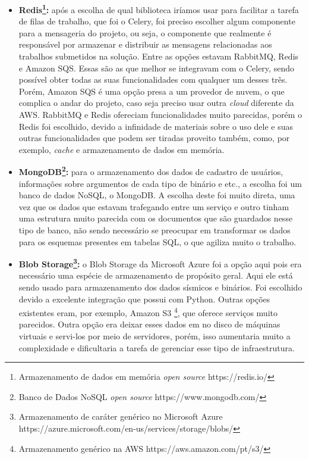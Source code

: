 \documentclass[11pt,twoside]{article}
\begin{document}
\begin{itemize}
  \item \textbf{Redis\footnote{Armazenamento de dados em memória \emph{open source} https://redis.io/}:} após a escolha de qual biblioteca iríamos usar para facilitar a tarefa de filas de trabalho, que foi o Celery, foi preciso escolher algum componente para a mensageria do projeto, ou seja, o
  componente que realmente é responsável por armazenar e distribuir as mensagens relacionadas aos trabalhos submetidos na solução. Entre as opções estavam RabbitMQ, Redis e Amazon SQS. Essas são as que melhor se 
  integravam com o Celery, sendo possível obter todas as suas funcionalidades com qualquer um desses três. Porém, Amazon SQS é uma opção presa a um provedor de nuvem, o que complica o andar do projeto, caso seja 
  preciso usar outra \emph{cloud} diferente da AWS. RabbitMQ e Redis ofereciam funcionalidades muito parecidas, porém o Redis foi escolhido, devido a infinidade de materiais sobre o uso dele e suas outras funcionalidades
  que podem ser tiradas proveito também, como, por exemplo, \emph{cache} e armazenamento de dados em memória.

  \item \textbf{MongoDB\footnote{Banco de Dados NoSQL \emph{open source} https://www.mongodb.com/}:} para o armazenamento dos dados de cadastro de usuários, informações sobre argumentos de cada tipo de binário e etc., a escolha foi um banco de dados NoSQL, o MongoDB. A escolha deste
  foi muito direta, uma vez que os dados que estavam trafegando entre um serviço e outro tinham uma estrutura muito parecida com os documentos que são guardados nesse tipo de banco, não sendo necessário se preocupar
  em transformar os dados para os esquemas presentes em tabelas SQL, o que agiliza muito o trabalho.

  \item \textbf{Blob Storage\footnote{Armazenamento de caráter genérico no Microsoft Azure https://azure.microsoft.com/en-us/services/storage/blobs/}:} o Blob Storage da Microsoft Azure foi a opção aqui pois era necessário uma espécie de armazenamento de propósito geral. Aqui ele está sendo usado para armazenamento dos dados sísmicos e
  binários. Foi escolhido devido a excelente integração que possui com Python. Outras opções existentes eram, por exemplo, Amazon S3 \footnote{Armazenamento genérico na AWS https://aws.amazon.com/pt/s3/}, que oferece serviços muito parecidos. Outra opção era deixar esses dados em 
  no disco de máquinas virtuais e servi-los por meio de servidores, porém, isso aumentaria muito a complexidade e dificultaria a tarefa de gerenciar esse tipo de infraestrutura.
\end{itemize}
\end{document}
